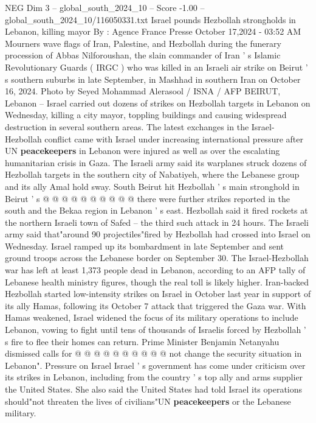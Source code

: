 \begin{textsample}{NEG Dim 3 – global\_south\_2024\_10 – Score -1.00 – global\_south\_2024\_10/116050331.txt}  \label{ex:f3_neg_058}
Israel pounds Hezbollah strongholds in Lebanon, killing mayor By : Agence France Presse October 17,2024 - 03:52 AM Mourners wave flags of Iran, Palestine, and Hezbollah during the funerary procession of Abbas Nilforoushan, the slain commander of Iran ' s Islamic Revolutionary Guards ( IRGC ) who was killed in an Israeli air strike on Beirut ' s southern suburbs in late September, in Mashhad in southern Iran on October 16, 2024.
Photo by Seyed Mohammad Alerasool / ISNA / AFP BEIRUT, Lebanon -- Israel carried out dozens of strikes on Hezbollah targets in Lebanon on Wednesday, killing a city mayor, toppling buildings and causing widespread destruction in several southern areas.
The latest exchanges in the Israel-Hezbollah conflict came with Israel under increasing international pressure after UN \textbf{peacekeepers} in Lebanon were injured as well as over the escalating humanitarian crisis in Gaza.
The Israeli army said its warplanes struck dozens of Hezbollah targets in the southern city of Nabatiyeh, where the Lebanese group and its ally Amal hold sway.
South Beirut hit Hezbollah ' s main stronghold in Beirut ' s @ @ @ @ @ @ @ @ @ @ there were further strikes reported in the south and the Bekaa region in Lebanon ' s east.
Hezbollah said it fired rockets at the northern Israeli town of Safed -- the third such attack in 24 hours.
The Israeli army said that"around 90 projectiles"fired by Hezbollah had crossed into Israel on Wednesday.
Israel ramped up its bombardment in late September and sent ground troops across the Lebanese border on September 30.
The Israel-Hezbollah war has left at least 1,373 people dead in Lebanon, according to an AFP tally of Lebanese health ministry figures, though the real toll is likely higher.
Iran-backed Hezbollah started low-intensity strikes on Israel in October last year in support of its ally Hamas, following its October 7 attack that triggered the Gaza war.
With Hamas weakened, Israel widened the focus of its military operations to include Lebanon, vowing to fight until tens of thousands of Israelis forced by Hezbollah ' s fire to flee their homes can return.
Prime Minister Benjamin Netanyahu dismissed calls for @ @ @ @ @ @ @ @ @ @ not change the security situation in Lebanon".
Pressure on Israel Israel ' s government has come under criticism over its strikes in Lebanon, including from the country ' s top ally and arms supplier the United States.
She also said the United States had told Israel its operations should"not threaten the lives of civilians"UN \textbf{peacekeepers} or the Lebanese military.

\end{textsample}
